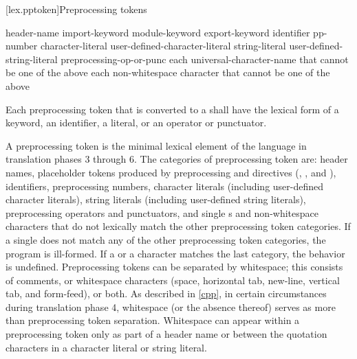 [lex.pptoken]{Preprocessing tokens}

%
\begin{bnf}
\br
    header-name\br
    import-keyword\br
    module-keyword\br
    export-keyword\br
    identifier\br
    pp-number\br
    character-literal\br
    user-defined-character-literal\br
    string-literal\br
    user-defined-string-literal\br
    preprocessing-op-or-punc\br
    \textnormal{each} universal-character-name \textnormal{that cannot be one of the above}\br
    \textnormal{each non-whitespace character that cannot be one of the above}
\end{bnf}

\pnum
Each preprocessing token that is converted to a 
shall have the lexical form of a keyword, an identifier, a literal,
or an operator or punctuator.

\pnum
A preprocessing token is the minimal lexical element of the language in translation
phases 3 through 6. The categories of preprocessing token are: header names,
placeholder tokens produced by preprocessing  and  directives
(, , and ),
identifiers, preprocessing numbers, character literals (including user-defined character
literals), string literals (including user-defined string literals), preprocessing
operators and punctuators, and single s and non-whitespace characters that do not lexically
match the other preprocessing token categories.
If a single 
does not match any of the other preprocessing token categories,
the program is ill-formed.
If a  or a  character
matches the last category, the behavior is undefined. Preprocessing tokens can be
separated by
%
whitespace;
%
this consists of comments, or whitespace
characters (space, horizontal tab, new-line, vertical tab, and
form-feed), or both. As described in \ref{cpp}, in certain
circumstances during translation phase 4, whitespace (or the absence
thereof) serves as more than preprocessing token separation. Whitespace
can appear within a preprocessing token only as part of a header name or
between the quotation characters in a character literal or
string literal.

